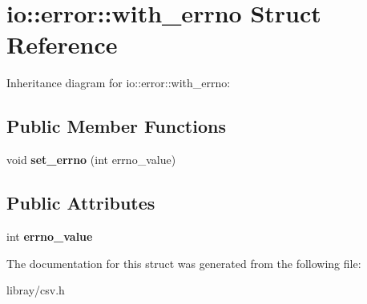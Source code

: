 \hypertarget{structio_1_1error_1_1with__errno}{}\section{io\+:\+:error\+:\+:with\+\_\+errno Struct Reference}
\label{structio_1_1error_1_1with__errno}


Inheritance diagram for io\+:\+:error\+:\+:with\+\_\+errno\+:
\subsection*{Public Member Functions}
\begin{DoxyCompactItemize}
\item 
\mbox{\label{structio_1_1error_1_1with__errno_a572cfa4b4a96792cd1d17dc9ad2eb5a9}} 
void {\bfseries set\+\_\+errno} (int errno\+\_\+value)
\end{DoxyCompactItemize}
\subsection*{Public Attributes}
\begin{DoxyCompactItemize}
\item 
\mbox{\label{structio_1_1error_1_1with__errno_a99dcacba02cb53351fe64d7e064406be}} 
int {\bfseries errno\+\_\+value}
\end{DoxyCompactItemize}


The documentation for this struct was generated from the following file\+:\begin{DoxyCompactItemize}
\item 
libray/csv.\+h\end{DoxyCompactItemize}
